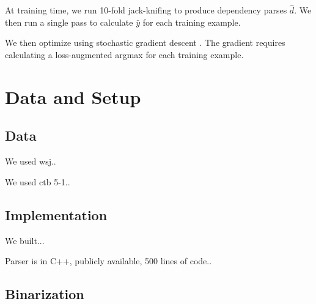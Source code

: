 \documentclass[11pt,letterpaper]{article}
\begin{document}
At training time, we run 10-fold jack-knifing to produce dependency parses $\hat{d}$. We then run a single pass to calculate $\bar{y}$ for each training example.

We then optimize using stochastic gradient descent \cite{}. The gradient requires calculating a loss-augmented argmax for each training example.


















\section{Data and Setup}


\subsection{Data}

We used wsj..

We used ctb 5-1..




\subsection{Implementation}

We built...

Parser is in C++, publicly available, 500 lines of code..


\subsection{Binarization}
\end{document}
